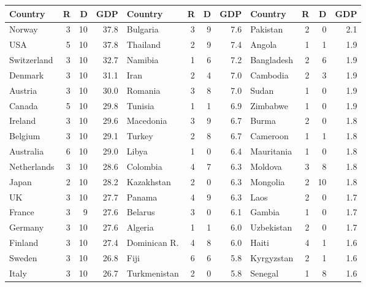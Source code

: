 \begin{table}
\caption{The country data set used as an example
in Chapter \ref{c_descr1} (R=\texttt{region}, D=\texttt{democracy}).}
\label{t_countrydata}
%

\begin{table}
\begin{tabular}{|lrrr|lrrr|lrrr|}\hline
Country & R & D & GDP &
Country & R & D & GDP &
Country & R & D & GDP \\  \hline
Norway        & 3 & 10 &37.8 &Bulgaria      & 3 &  9 & 7.6&Pakistan     &2& 0&  2.1\\
USA           & 5 & 10 &37.8 &Thailand      & 2 &  9 & 7.4&Angola       &1& 1&  1.9\\
Switzerland   & 3 & 10 &32.7 &Namibia       & 1 &  6 & 7.2&Bangladesh   &2& 6&  1.9\\
Denmark       & 3 & 10 &31.1 &Iran          & 2 &  4 & 7.0&Cambodia     &2& 3&  1.9\\
Austria       & 3 & 10 &30.0 &Romania       & 3 &  8 & 7.0&Sudan        &1& 0&  1.9\\
Canada        & 5 & 10 &29.8 &Tunisia       & 1 &  1 & 6.9&Zimbabwe     &1& 0&  1.9\\
Ireland       & 3 & 10 &29.6 &Macedonia     & 3 &  9 & 6.7&Burma        &2& 0&  1.8\\
Belgium       & 3 & 10 &29.1 &Turkey        & 2 &  8 & 6.7&Cameroon     &1& 1&  1.8\\
Australia     & 6 & 10 &29.0 &Libya         & 1 &  0 & 6.4&Mauritania   &1& 0&  1.8\\
Netherlands   & 3 & 10 &28.6 &Colombia      & 4 &  7 & 6.3&Moldova      &3& 8&  1.8\\
Japan         & 2 & 10 &28.2 &Kazakhstan    & 2 &  0 & 6.3&Mongolia     &2&10&  1.8\\
UK            & 3 & 10 &27.7 &Panama        & 4 &  9 & 6.3&Laos         &2& 0&  1.7\\
France        & 3 &  9 &27.6 &Belarus       & 3 &  0 & 6.1&Gambia       &1& 0&  1.7\\
Germany       & 3 & 10 &27.6 &Algeria       & 1 &  1 & 6.0&Uzbekistan   &2& 0&  1.7\\
Finland       & 3 & 10 &27.4 &Dominican R.  & 4 &  8 & 6.0&Haiti        &4& 1&  1.6\\
Sweden        & 3 & 10 &26.8 &Fiji          & 6 &  6 & 5.8&Kyrgyzstan   &2& 1&  1.6\\
Italy         & 3 & 10 &26.7 &Turkmenistan  & 2 &  0 & 5.8&Senegal      &1& 8&  1.6\\

\end{tabular}
\end{table}
\end{table}
